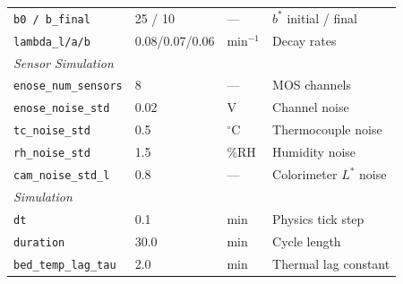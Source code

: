﻿\documentclass[12pt, a4paper]{report}
\begin{document}
\begin{table}[H]
\begin{tabular}{@{}llll@{}}
\texttt{b0 / b\_final} & 25 / 10 & --- & $b^*$ initial / final \\
\texttt{lambda\_l/a/b} & 0.08/0.07/0.06 & min$^{-1}$ & Decay rates \\
\midrule
\multicolumn{4}{l}{\textit{Sensor Simulation}} \\
\texttt{enose\_num\_sensors} & 8 & --- & MOS channels \\
\texttt{enose\_noise\_std} & 0.02 & V & Channel noise \\
\texttt{tc\_noise\_std} & 0.5 & $^\circ$C & Thermocouple noise \\
\texttt{rh\_noise\_std} & 1.5 & \%RH & Humidity noise \\
\texttt{cam\_noise\_std\_l} & 0.8 & --- & Colorimeter $L^*$ noise \\
\midrule
\multicolumn{4}{l}{\textit{Simulation}} \\
\texttt{dt} & 0.1 & min & Physics tick step \\
\texttt{duration} & 30.0 & min & Cycle length \\
\texttt{bed\_temp\_lag\_tau} & 2.0 & min & Thermal lag constant \\
\bottomrule
\end{tabular}
\end{table}
\end{document}
